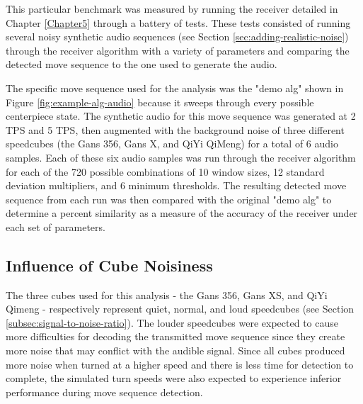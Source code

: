 This particular benchmark was measured by running the receiver detailed
in Chapter \ref{Chapter5} through a battery of tests. These tests
consisted of running several noisy synthetic audio sequences (see
Section \ref{sec:adding-realistic-noise}) through the receiver algorithm
with a variety of parameters and comparing the detected move sequence
to the one used to generate the audio.

The specific move sequence used for the analysis was the "demo alg"
shown in Figure \ref{fig:example-alg-audio} because it sweeps through
every possible centerpiece state. The synthetic audio for this move
sequence was generated at 2 TPS and 5 TPS, then augmented with the
background noise of three different speedcubes (the Gans 356, Gans X,
and QiYi QiMeng) for a total of 6 audio samples. Each of these six
audio samples was run through the receiver algorithm for each of the
720 possible combinations of 10 window sizes, 12 standard deviation
multipliers, and 6 minimum thresholds. The resulting detected move
sequence from each run was then compared with the original "demo alg"
to determine a percent similarity as a measure of the accuracy of the
receiver under each set of parameters.

\subsection{Influence of Cube Noisiness}
\label{subsec:influence-cube-noisiness}

The three cubes used for this analysis - the Gans 356, Gans XS, and
QiYi Qimeng - respectively represent quiet, normal, and loud speedcubes
(see Section \ref{subsec:signal-to-noise-ratio}). The louder speedcubes
were expected to cause more difficulties for decoding the transmitted
move sequence since they create more noise that may conflict with the
audible signal. Since all cubes produced more noise when turned at a
higher speed and there is less time for detection to complete, the
simulated turn speeds were also expected to experience inferior
performance during move sequence detection.

